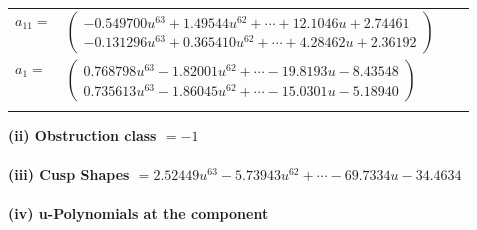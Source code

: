 \documentclass[1p]{elsarticle_modified}
\theoremstyle{definition}
\begin{document}
\begin{tabular}{m{7pt} m{180pt} m{7pt} m{180pt} }
\flushright $a_{11}=$&$\begin{pmatrix}-0.549700 u^{63}+1.49544 u^{62}+\cdots+12.1046 u+2.74461\\-0.131296 u^{63}+0.365410 u^{62}+\cdots+4.28462 u+2.36192\end{pmatrix}$ \\
\flushright $a_{1}=$&$\begin{pmatrix}0.768798 u^{63}-1.82001 u^{62}+\cdots-19.8193 u-8.43548\\0.735613 u^{63}-1.86045 u^{62}+\cdots-15.0301 u-5.18940\end{pmatrix}$\\&\end{tabular}
\flushleft \textbf{(ii) Obstruction class $= -1$}\\~\\
\flushleft \textbf{(iii) Cusp Shapes $= 2.52449 u^{63}-5.73943 u^{62}+\cdots-69.7334 u-34.4634$}\\~\\
\newpage\renewcommand{\arraystretch}{1}
\flushleft \textbf{(iv) u-Polynomials at the component}\newline \\
\end{document}
